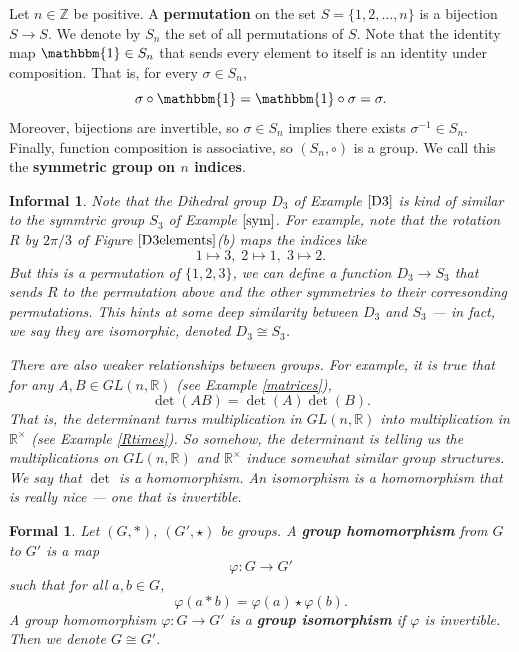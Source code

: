 \documentclass{amsart}
\newtheorem*{formal}{Formal}
\newtheorem*{informal}{Informal}
\begin{document}
\begin{example}\label{sym}
   Let \(n\in\mathbb{Z}\) be positive. A \textbf{permutation} on the set \(S =
	\{1, 2, \ldots, n\}\) is a bijection
	\(S\to S\). We denote by \(S_n\) the set of all permutations of \(S\). Note
	that the identity map \(\mathbbm{1}\in S_n\) that sends every element to
	itself is an identity
	under composition. That is, for every \(\sigma\in S_n\), 
	\[
		\sigma\circ\mathbbm{1} = \mathbbm{1}\circ\sigma = \sigma.
	\]
	Moreover, bijections are invertible, so \(\sigma\in S_n\) implies there
	exists \(\sigma^{-1}\in S_n\). Finally, function composition is associative,
	so \((S_n, \circ)\) is a group. We call this the \textbf{symmetric group on
	\(n\) indices}.
\end{example}


\begin{definition}\label{homiso}
	\begin{informal}
		Note that the Dihedral group \(D_3\) of Example \(\ref{D3}\) is kind of
		similar to the symmtric group \(S_3\) of Example \(\ref{sym}\). For example,
		note that the rotation \(R\) by \(2\pi/3\) of Figure \(\ref{D3elements}\)(b)
		maps the indices like
		\[
		   1\mapsto 3, \; 2\mapsto 1,\; 3\mapsto 2.
		\]
		But this is a permutation of \(\{1, 2, 3\}\), we can define a function
		\(D_3\to S_3\) that sends \(R\) to the permutation above and the other
		symmetries to their corresonding permutations. This hints at
		some deep similarity 
		between \(D_3\) and \(S_3\) --- in fact, we say they are
		\emph{isomorphic}, denoted \(D_3\cong S_3\).

		There are also weaker relationships between groups. For example, it is
		true that for any \(A, B\in GL(n, \mathbb{R})\) (see Example
		\ref{matrices}),
		\[
		   \det(AB) = \det(A)\det(B).
		\]
		That is, the determinant turns multiplication in \(GL(n,
		\mathbb{R})\) into multiplication in \(\mathbb{R}^\times\) (see Example
		\ref{Rtimes}).
		So somehow, the determinant is telling us the multiplications
		on \(GL(n, \mathbb{R})\) and \(\mathbb{R}^\times\) induce somewhat similar
		group structures. We say that \(\det\) is a \emph{homomorphism}. An
		isomorphism is a homomorphism that is really nice --- one that is
		invertible.
	\end{informal}

	\begin{formal}
	   Let \((G, \ast)\), \((G', \star)\) be groups. A \textbf{group homomorphism}
		from \(G\) to \(G'\)	is a map
		\[
		   \varphi: G\to G'
		\]
		such that for all \(a, b\in G\), 
		\[
		   \varphi(a\ast b) = \varphi(a)\star \varphi(b).
		\]
		A group homomorphism \(\varphi: G\to G'\) is a \textbf{group isomorphism}
		if \(\varphi\) is invertible. Then we denote \(G\cong G'\).
	\end{formal}
\end{definition}
\end{document}
